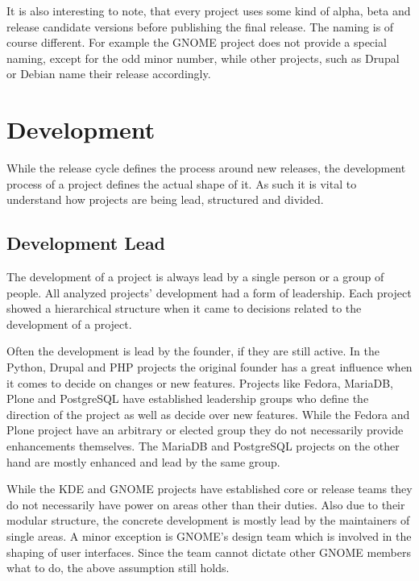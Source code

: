 It is also interesting to note, that every project uses some kind of alpha,
beta and release candidate versions before publishing the final release. The
naming is of course different. For example the GNOME project does not provide a
special naming, except for the odd minor number, while other projects, such as
Drupal or Debian name their release accordingly.



\section{Development} %

While the release cycle defines the process around new releases, the
development process of a project defines the actual shape of it. As such it is
vital to understand how projects are being lead, structured and divided.

\subsection{Development Lead} %

The development of a project is always lead by a single person or a group of
people. All analyzed projects' development had a form of leadership. Each
project showed a hierarchical structure when it came to decisions related to
the development of a project.

Often the development is lead by the founder, if they are still active. In the
Python, Drupal and PHP projects the original founder has a great influence when
it comes to decide on changes or new features. Projects like Fedora, MariaDB,
Plone and PostgreSQL have established leadership groups who define the
direction of the project as well as decide over new features. While the Fedora
and Plone project have an arbitrary or elected group they do not necessarily
provide enhancements themselves. The MariaDB and PostgreSQL projects on the
other hand are mostly enhanced and lead by the same group.

While the KDE and GNOME projects have established core or release teams they do
not necessarily have power on areas other than their duties. Also due to their
modular structure, the concrete development is mostly lead by the maintainers
of single areas. A minor exception is GNOME's design team which is involved in
the shaping of user interfaces. Since the team cannot dictate other GNOME
members what to do, the above assumption still holds.

